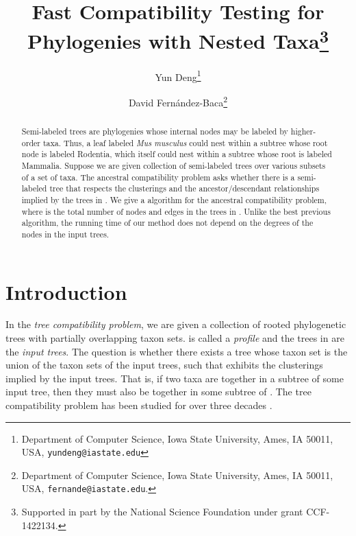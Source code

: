 \documentclass[11pt]{article}
\theoremstyle{definition}
\begin{document}
\title{Fast Compatibility Testing for Phylogenies with Nested Taxa\thanks{Supported in part by the National Science Foundation under grant CCF-1422134.}}
\author{
Yun Deng\thanks{Department of Computer Science, Iowa State University, Ames, IA 50011, USA, {\tt yundeng@iastate.edu}}
\and
David Fern\'{a}ndez-Baca\thanks{Department of Computer Science, Iowa State University, Ames, IA 50011, USA, {\tt fernande@iastate.edu}. 
}
}

\date{\empty}

\maketitle

\begin{abstract}
Semi-labeled trees are phylogenies whose internal nodes may be labeled by higher-order taxa.  Thus, a leaf labeled \emph{Mus musculus} could nest within a subtree whose root node is labeled Rodentia, which itself could nest within a subtree whose root is labeled Mammalia.  
Suppose we are given collection  of semi-labeled trees over various subsets of a set of taxa.  The ancestral compatibility problem asks whether there is a semi-labeled tree  that respects the clusterings and the ancestor/descendant relationships implied by the trees in . 
We give a  algorithm for the ancestral compatibility problem, where  is the total number of nodes and edges in the trees in .  Unlike the best previous algorithm, the running time of our method does not depend on the degrees of the nodes in the input trees.  
\end{abstract}

\section{Introduction}

In the \emph{tree compatibility problem}, we are given a collection  of rooted phylogenetic trees with partially overlapping taxon sets.  is called a \emph{profile} and the trees in  are the \emph{input trees}.  The question is whether there exists a tree  whose taxon set is the union of the taxon sets of the input trees, such that  exhibits the clusterings implied by the input trees.  That is, if two taxa are together in a subtree of some input tree, then they must also be together in some subtree of . The tree compatibility problem has been studied for over three decades \cite{Aho81a,DengFB2016,HenzingerKingWarnow99,Steel92}.
\end{document}
